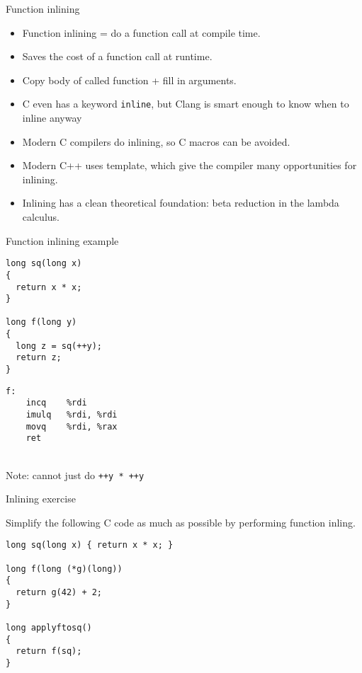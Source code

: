 \documentclass[landscape]{beamer}
\begin{document}
\begin{frame}{Function inlining}

\begin{itemize}
\item
Function inlining = do a function call at compile time.
\item
Saves the cost of a function call at runtime.
\item
Copy body of called function + fill in arguments.
\item C even has a keyword \texttt{inline}, but Clang is smart enough to know when to inline anyway
\item
Modern C compilers do inlining, so C macros can be avoided.
\item
Modern C++ uses template, which give the compiler many opportunities for inlining.
\item
Inlining has a clean theoretical foundation: beta reduction in the lambda calculus.

\end{itemize}


\end{frame}


\begin{frame}[fragile]{Function inlining example}
\begin{minipage}{.5\textwidth}
\begin{verbatim}
long sq(long x)
{
  return x * x;
}

long f(long y)
{
  long z = sq(++y);
  return z;
}
\end{verbatim}
\end{minipage}
%
\begin{minipage}{.4\textwidth}
\begin{verbatim}
f:                   
	incq	%rdi
	imulq	%rdi, %rdi
	movq	%rdi, %rax
	ret
\end{verbatim}
\end{minipage}
\\[2em]

Note: cannot just do \texttt{++y * ++y}
\end{frame}

\begin{frame}[fragile]{Inlining exercise}

Simplify the following C code as much as possible by performing function inling.

\begin{verbatim}
long sq(long x) { return x * x; }

long f(long (*g)(long))
{
  return g(42) + 2;
}

long applyftosq()
{
  return f(sq);
}
\end{verbatim}

\end{frame}
\end{document}
